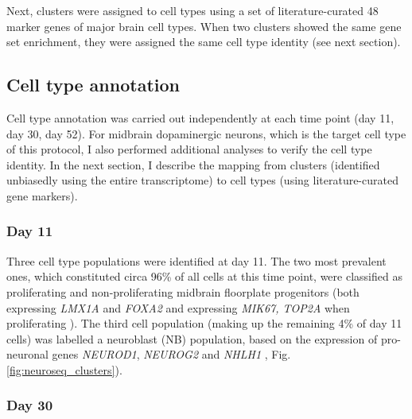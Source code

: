 Next, clusters were assigned to cell types using a set of literature-curated 48 marker genes of major brain cell types. 
When two clusters showed the same gene set enrichment, they were assigned the same cell type identity (see next section).

\subsection{Cell type annotation}
Cell type annotation was carried out independently at each time point (day 11, day 30, day 52).
For midbrain dopaminergic neurons, which is the target cell type of this protocol, I also performed additional analyses to verify the cell type identity.
In the next section, I describe the mapping from clusters (identified unbiasedly using the entire transcriptome) to cell types (using literature-curated gene markers).

\subsubsection{Day 11}

Three cell type populations were identified at day 11.
The two most prevalent ones, which constituted circa 96\% of all cells at this time point, were classified as proliferating and non-proliferating midbrain floorplate progenitors (both expressing \textit{LMX1A} and \textit{FOXA2} and expressing \textit{MIK67, TOP2A} when proliferating \cite{la2016molecular}).
The third cell population (making up the remaining 4\% of day 11 cells) was labelled a neuroblast (NB) population, based on the expression of pro-neuronal genes \textit{NEUROD1}, \textit{NEUROG2} and \textit{NHLH1} \cite{bertrand2002proneural, lacomme2012neurog2}, Fig. \ref{fig:neuroseq_clusters}).

\subsubsection{Day 30}

